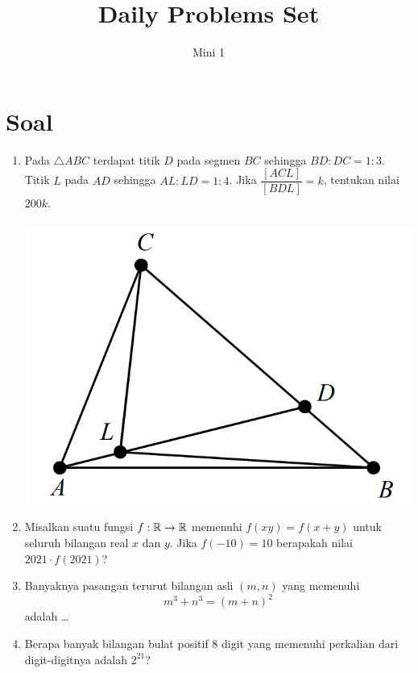 \documentclass[11pt]{scrartcl}
\begin{document}
	\title{Daily Problems Set} %
	\date{}
	\author{Mini 1}
	\maketitle

	\section{Soal}
	\begin{enumerate}
	    \item Pada $\triangle ABC$ terdapat titik $D$ pada segmen $BC$ sehingga $BD:DC=1:3$. Titik $L$ pada $AD$ sehingga $AL:LD=1:4$. Jika $\dfrac{[ACL]}{[BDL]}=k$, tentukan nilai $200k$.
            \begin{center}
                \includegraphics[scale=0.5]{geogampang.PNG}
            \end{center}
	    
	    
	    \item Misalkan suatu fungsi $f:\mathbb R \rightarrow \mathbb R$ memenuhi $f(xy)=f(x+y)$ untuk seluruh bilangan real $x$ dan $y$. Jika $f(-10)=10$ berapakah nilai $2021\cdot f(2021)$?
	    
	    \item Banyaknya pasangan terurut bilangan asli $(m,n)$ yang memenuhi $$m^3+n^3=(m+n)^2$$ adalah \dots    
	    
	    \item Berapa banyak bilangan bulat positif 8 digit yang memenuhi perkalian dari digit-digitnya adalah $2^{21}$?
	\end{enumerate}
	
\end{document}

